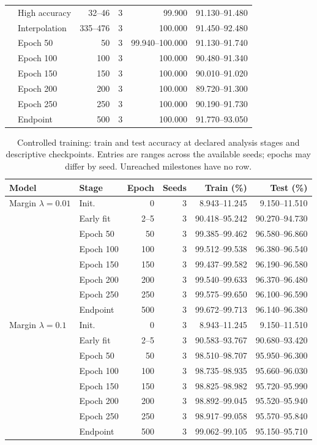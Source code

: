 \begin{table}[!htbp]
\begin{tabular}{llrrrr}
 & High accuracy & 32--46 & 3 & 99.900 & 91.130--91.480\\
 & Interpolation & 335--476 & 3 & 100.000 & 91.450--92.480\\
 & Epoch 50 & 50 & 3 & 99.940--100.000 & 91.130--91.740\\
 & Epoch 100 & 100 & 3 & 100.000 & 90.480--91.340\\
 & Epoch 150 & 150 & 3 & 100.000 & 90.010--91.020\\
 & Epoch 200 & 200 & 3 & 100.000 & 89.720--91.300\\
 & Epoch 250 & 250 & 3 & 100.000 & 90.190--91.730\\
 & Endpoint & 500 & 3 & 100.000 & 91.770--93.050\\
\bottomrule\end{tabular}\end{table}

\FloatBarrier
\begin{table}[!htbp]\centering
\caption{Controlled training: train and test accuracy at declared analysis stages and descriptive checkpoints. Entries are ranges across the available seeds; epochs may differ by seed. Unreached milestones have no row.}\label{tab:perf-5-0}
\small\setlength{\tabcolsep}{4pt}
\begin{tabular}{llrrrr}\toprule
Model & Stage & Epoch & Seeds & Train (\%) & Test (\%)\\\midrule
Margin $\lambda=0.01$ & Init. & 0 & 3 & 8.943--11.245 & 9.150--11.510\\
 & Early fit & 2--5 & 3 & 90.418--95.242 & 90.270--94.730\\
 & Epoch 50 & 50 & 3 & 99.385--99.462 & 96.580--96.860\\
 & Epoch 100 & 100 & 3 & 99.512--99.538 & 96.380--96.540\\
 & Epoch 150 & 150 & 3 & 99.437--99.582 & 96.190--96.580\\
 & Epoch 200 & 200 & 3 & 99.540--99.633 & 96.370--96.480\\
 & Epoch 250 & 250 & 3 & 99.575--99.650 & 96.100--96.590\\
 & Endpoint & 500 & 3 & 99.672--99.713 & 96.140--96.380\\
\midrule
Margin $\lambda=0.1$ & Init. & 0 & 3 & 8.943--11.245 & 9.150--11.510\\
 & Early fit & 2--5 & 3 & 90.583--93.767 & 90.680--93.420\\
 & Epoch 50 & 50 & 3 & 98.510--98.707 & 95.950--96.300\\
 & Epoch 100 & 100 & 3 & 98.735--98.935 & 95.660--96.030\\
 & Epoch 150 & 150 & 3 & 98.825--98.982 & 95.720--95.990\\
 & Epoch 200 & 200 & 3 & 98.892--99.045 & 95.520--95.940\\
 & Epoch 250 & 250 & 3 & 98.917--99.058 & 95.570--95.840\\
 & Endpoint & 500 & 3 & 99.062--99.105 & 95.150--95.710\\
\bottomrule\end{tabular}\end{table}

